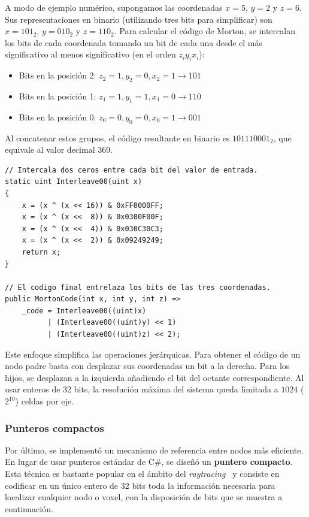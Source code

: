 A modo de ejemplo numérico, supongamos las coordenadas $x = 5$, $y = 2$ y $z = 6$. Sus representaciones en binario (utilizando tres bits para simplificar) son $x = 101_2$, $y = 010_2$ y $z = 110_2$. Para calcular el código de Morton, se intercalan los bits de cada coordenada tomando un bit de cada una desde el más significativo al menos significativo (en el orden $z_i y_i x_i$):
\begin{itemize}
    \item Bits en la posición 2: $z_2=1, y_2=0, x_2=1 \rightarrow 101$
    \item Bits en la posición 1: $z_1=1, y_1=1, x_1=0 \rightarrow 110$
    \item Bits en la posición 0: $z_0=0, y_0=0, x_0=1 \rightarrow 001$
\end{itemize}
Al concatenar estos grupos, el código resultante en binario es $101110001_2$, que equivale al valor decimal $369$.

\begin{lstlisting}[language={[Sharp]C}]
// Intercala dos ceros entre cada bit del valor de entrada.
static uint Interleave00(uint x)
{
    x = (x ^ (x << 16)) & 0xFF0000FF;
    x = (x ^ (x <<  8)) & 0x0300F00F;
    x = (x ^ (x <<  4)) & 0x030C30C3;
    x = (x ^ (x <<  2)) & 0x09249249;
    return x;
}

// El codigo final entrelaza los bits de las tres coordenadas.
public MortonCode(int x, int y, int z) =>
    _code = Interleave00((uint)x)
          | (Interleave00((uint)y) << 1)
          | (Interleave00((uint)z) << 2);
\end{lstlisting}

Este enfoque simplifica las operaciones jerárquicas.
Para obtener el código de un nodo padre basta con desplazar sus coordenadas un bit a la derecha.
Para los hijos, se desplazan a la izquierda añadiendo el bit del octante correspondiente.
Al usar enteros de 32 bits, la resolución máxima del sistema queda limitada a $1024$ ($2^{10}$) celdas por eje.

\subsubsection{Punteros compactos}
\label{sec:svolink}

Por último, se implementó un mecanismo de referencia entre nodos más eficiente.
En lugar de usar punteros estándar de C\#, se diseñó un \textbf{puntero compacto}.
Esta técnica es bastante popular en el ámbito del \textit{raytracing}~\cite{laine2010efficient} y consiste en codificar en un único entero de 32 bits toda la información necesaria para localizar cualquier nodo o \gls{voxel}, con la disposición de bits que se muestra a continuación.

